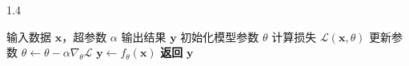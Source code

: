 \begin{algorithm}[htbp]
    \begin{spacing}{1.4}
    \caption{示例算法流程}
    \label{alg:example}
    \begin{algorithmic}[1]
        \REQUIRE 输入数据 $\mathbf{x}$，超参数 $\alpha$
        \ENSURE 输出结果 $\mathbf{y}$
        \STATE 初始化模型参数 $\theta$
            \STATE 计算损失 $\mathcal{L}(\mathbf{x}, \theta)$
            \STATE 更新参数 $\theta \leftarrow \theta - \alpha \nabla_{\theta}\mathcal{L}$
        \ENDFOR
        \STATE $\mathbf{y} \leftarrow f_{\theta}(\mathbf{x})$
        \STATE \textbf{返回} $\mathbf{y}$
    \end{algorithmic}
    \end{spacing}
\end{algorithm}

